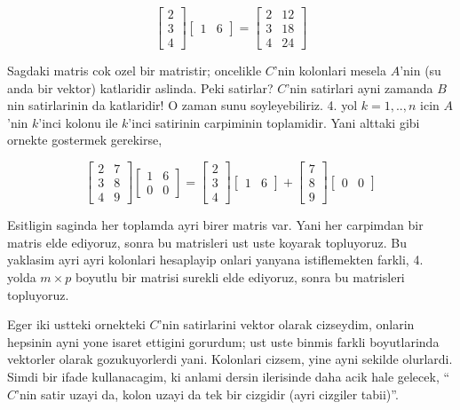 \documentclass[12pt,fleqn]{article}\usepackage{../common}
\begin{document}
$$ 
\left[\begin{array}{r}
2 \\ 3 \\ 4
\end{array}\right]
\left[\begin{array}{rr}
1 & 6
\end{array}\right]
=
\left[\begin{array}{rr}
2 & 12 \\
3 & 18 \\
4 & 24
\end{array}\right]
 $$

 Sagdaki matris cok ozel bir matristir; oncelikle $C$'nin kolonlari mesela
 $A$'nin (su anda bir vektor) katlaridir aslinda. Peki satirlar?  $C$'nin
 satirlari ayni zamanda $B$ nin satirlarinin da katlaridir! O zaman sunu
 soyleyebiliriz. 4. yol $k=1,..,n$ icin $A$'nin $k$'inci kolonu ile
 $k$'inci satirinin carpiminin toplamidir. Yani alttaki gibi ornekte
 gostermek gerekirse, 

$$ 
\left[\begin{array}{rr}
2 & 7 \\
3 & 8 \\
4 & 9
\end{array}\right]
\left[\begin{array}{rr}
1 & 6 \\
0 & 0
\end{array}\right]
=
\left[\begin{array}{r}
2 \\ 3\\ 4
\end{array}\right]
\left[\begin{array}{rr}
1 & 6
\end{array}\right] 
+
\left[\begin{array}{r}
7 \\ 8\\ 9
\end{array}\right]
\left[\begin{array}{rr}
0 & 0
\end{array}\right] 
 $$

Esitligin saginda her toplamda ayri birer matris var. Yani her carpimdan
bir matris elde ediyoruz, sonra bu matrisleri ust uste koyarak
topluyoruz. Bu yaklasim ayri ayri kolonlari hesaplayip onlari yanyana
istiflemekten farkli, 4. yolda $m \times p$ boyutlu bir matrisi surekli
elde ediyoruz, sonra bu matrisleri topluyoruz. 

Eger iki ustteki ornekteki $C$'nin satirlarini vektor olarak cizseydim,
onlarin hepsinin ayni yone isaret ettigini gorurdum; ust uste binmis farkli
boyutlarinda vektorler olarak gozukuyorlerdi yani. Kolonlari cizsem, yine
ayni sekilde olurlardi. Simdi bir ifade kullanacagim, ki anlami dersin
ilerisinde daha acik hale gelecek, ``$C$'nin satir uzayi da, kolon uzayi da
tek bir cizgidir (ayri cizgiler tabii)''.
\end{document}
